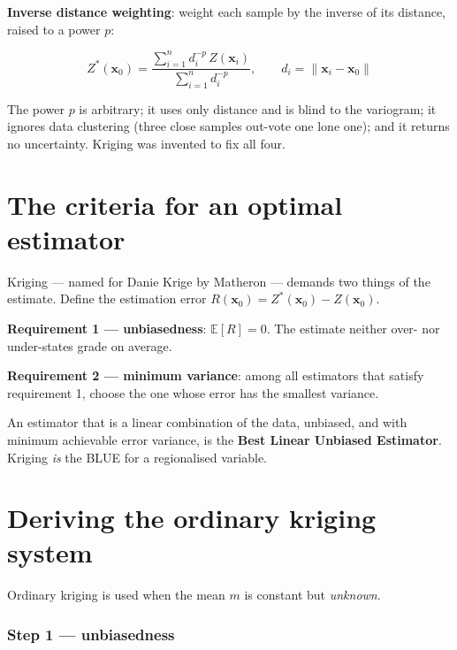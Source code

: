 \documentclass[11pt]{article}
\begin{document}
\textbf{Inverse distance weighting}: weight each sample by the inverse of
its distance, raised to a power $p$:

\begin{eqbox}
\[ Z^{*}(\mathbf{x}_0)=\frac{\sum_{i=1}^{n}d_i^{-p}\,Z(\mathbf{x}_i)}
   {\sum_{i=1}^{n} d_i^{-p}},
   \qquad d_i=\lVert\mathbf{x}_i-\mathbf{x}_0\rVert \tag{5.2}\]
\end{eqbox}

\begin{pitbox}
The power $p$ is arbitrary; it uses only distance and is blind to the
variogram; it ignores data clustering (three close samples out-vote one
lone one); and it returns no uncertainty. Kriging was invented to fix all
four.
\end{pitbox}

\section{The criteria for an optimal estimator}

Kriging --- named for Danie Krige by Matheron --- demands two things of
the estimate. Define the estimation error
$R(\mathbf{x}_0) = Z^{*}(\mathbf{x}_0)-Z(\mathbf{x}_0)$.

\textbf{Requirement 1 --- unbiasedness}: $\mathbb{E}[R]=0$. The estimate
neither over- nor under-states grade on average.

\textbf{Requirement 2 --- minimum variance}: among all estimators that
satisfy requirement 1, choose the one whose error has the smallest
variance.

\begin{keybox}
An estimator that is a linear combination of the data, unbiased, and with
minimum achievable error variance, is the \textbf{Best Linear Unbiased
Estimator}. Kriging \emph{is} the BLUE for a regionalised variable.
\end{keybox}

\section{Deriving the ordinary kriging system}

Ordinary kriging is used when the mean $m$ is constant but \emph{unknown}.

\subsubsection*{Step 1 --- unbiasedness}
\end{document}
